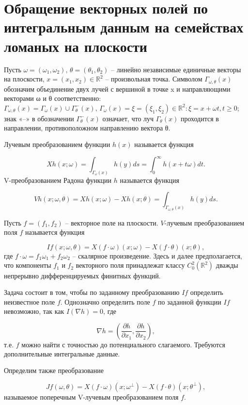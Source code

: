\section{Обращение векторных полей по интегральным данным на семействах ломаных на плоскости} 

Пусть $ \omega=(\omega_1,\omega_2 ), \, \theta=(\theta_1,\theta_2) $  – линейно независимые единичные векторы на плоскости, $x=(x_1,x_2 )\in \mathbb R^2$ – произвольная точка. Символом $\Gamma_{\omega,\theta}(x) $ обозначим объединение двух лучей с вершиной в точке x и направляющими векторами ω и θ соответственно:
$\Gamma_{\omega,\theta}(x)= \Gamma_{\omega}(x)\cup \Gamma_\theta^-(x), \,   \Gamma_{\omega}(x)={\xi=(\xi_1, \xi_2)\in\mathbb R^2: \xi=x+\omega t, t\geq 0}
$; знак «–» в обозначении $\Gamma_\theta^-(x)$ означает, что луч $\Gamma_\theta(x)$ проходится в направлении, противоположном направлению вектора θ.

Лучевым преобразованием функции $h(x)$ называется функция

$$Xh(x;\omega)=\int_{\Gamma_\omega (x)} h(y)ds=\int_0^\infty h(x+t\omega)dt.$$
V-преобразованием Радона функции $h$ называется функция

$$Vh(x;\omega,\theta)=Xh(x;\omega)-Xh(x;\theta)=\int_{\Gamma_{\omega,\theta}(x)} h(y)ds.$$

Пусть $f=(f_1,f_2 )$ – векторное поле на плоскости. $V$-лучевым преобразованием поля $f$ называется функция

$$If(x;\omega,\theta)=X(f\cdot\omega)(x;\omega)-X(f\cdot\theta)(x;\theta),$$
где $f\cdot\omega=f_1 \omega_1+f_2 \omega_2$ – скалярное произведение. Здесь и далее предполагается, что компоненты $f_1$ и $f_2$ векторного поля принадлежат классу $C_0^2 (\mathbb R^2 )$ дважды непрерывно дифференцируемых финитных функций.


Задача состоит в том, чтобы по заданному преобразованию $If$ определить неизвестное поле $f$. Однозначно определить поле $f$ по заданной функции $If$ невозможно, так как $I(\nabla h)=0$, где 

$$\nabla h=\left(\frac{\partial h}{\partial x_1},\frac{\partial h}{\partial x_2}\right),$$
т.е. $f$ можно найти с точностью до потенциального слагаемого. Требуются дополнительные интегральные данные.

Определим также преобразование

$$Jf(\omega,\theta)=X(f\cdot \omega)(x;\omega^\bot )-X(f\cdot\theta)(x;\theta^\bot),$$
называемое поперечным V-лучевым преобразованием поля $f$.

